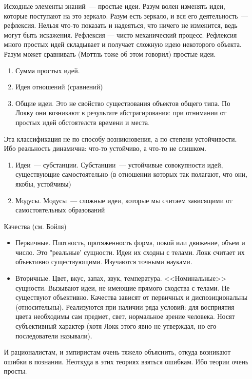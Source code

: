 Исходные элементы знаний~--- простые идеи. Разум волен изменять идеи, которые поступают
на это зеркало. Разум есть зеркало, и вся его деятельность~--- рефлексия. Нельзя что-то показать и надеяться, что ничего не изменится, ведь могут быть искажения. Рефлексия --- чисто механический процесс. Рефлексия много простых идей складывает и получает сложную идею некоторого объекта. Разум может сравнивать (Моттль тоже об этом говорил) простые идеи.
\begin{enumerate}
	\item Сумма простых идей.
	\item Идея отношений (сравнений) 
	\item Общие идеи. Это не свойство существования объектов общего типа. По Локку они возникают в результате абстрагирования: при отнимании от простых идей обстоятелств времени и места.
\end{enumerate}
	
Эта классификация не по способу возникновения, а по степени устойчивости. Ибо реальность динамична: что-то устойчиво, а что-то не слишком.
\begin{enumerate}
	\item Идеи~--- субстанции. Субстанции~--- устойчивые совокупности идей, существующие самостоятельно (в отношении которых так полагают, что они, якобы, устойчивы) 
	\item Модусы. Модусы~--- сложные идеи, которые мы считаем зависящими от самостоятельных образований
\end{enumerate}
	
Качества (см. Бойля) 
\begin{itemize}
 	\item Первичные. Плотность, протяженность форма, покой или движение, объем и число. Это "реальные' сущности. Идеи их сходны с телами. Локк считает их объективно существующими. Изучаются точными науками.
	\item Вторичные. Цвет, вкус, запах, звук, температура. <<Номинальные>> сущности. Вызывают идеи, не имеющие прямого сходства с телами. Не существуют объективно. Качества зависят от первичных и диспозициональны (относительны). Реализуются при наличии ряда условий: для восприятия цвета необходимы сам предмет, свет, нормальное зрение человека. Носят субъективный характер (хотя Локк этого явно не утверждал, но его последователи называли). 
\end{itemize} 

И рационалистам, и эмпиристам очень тяжело объяснить, откуда возникают ошибки в познании. Неоткуда в этих теориях взяться ошибкам. Ибо теории очень просты.

